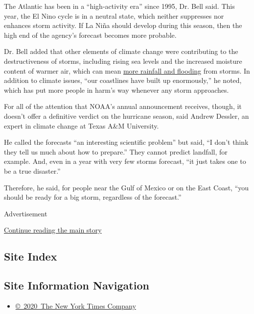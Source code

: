 The Atlantic has been in a ``high-activity era'' since 1995, Dr. Bell
said. This year, the El Nino cycle is in a neutral state, which neither
suppresses nor enhances storm activity. If La Niña should develop during
this season, then the high end of the agency's forecast becomes more
probable.

Dr. Bell added that other elements of climate change were contributing
to the destructiveness of storms, including rising sea levels and the
increased moisture content of warmer air, which can mean
\href{https://www.nytimes3xbfgragh.onion/2019/07/11/climate/hurricane-tropical-storms.html}{more
rainfall and flooding} from storms. In addition to climate issues, ``our
coastlines have built up enormously,'' he noted, which has put more
people in harm's way whenever any storm approaches.

For all of the attention that NOAA's annual announcement receives,
though, it doesn't offer a definitive verdict on the hurricane season,
said Andrew Dessler, an expert in climate change at Texas A\&M
University.

He called the forecasts ``an interesting scientific problem'' but said,
``I don't think they tell us much about how to prepare.'' They cannot
predict landfall, for example. And, even in a year with very few storms
forecast, ``it just takes one to be a true disaster.''

Therefore, he said, for people near the Gulf of Mexico or on the East
Coast, ``you should be ready for a big storm, regardless of the
forecast.''

Advertisement

\protect\hyperlink{after-bottom}{Continue reading the main story}

\hypertarget{site-index}{%
\subsection{Site Index}\label{site-index}}

\hypertarget{site-information-navigation}{%
\subsection{Site Information
Navigation}\label{site-information-navigation}}

\begin{itemize}
\tightlist
\item
  \href{https://help.nytimes3xbfgragh.onion/hc/en-us/articles/115014792127-Copyright-notice}{©~2020~The
  New York Times Company}
\end{itemize}

